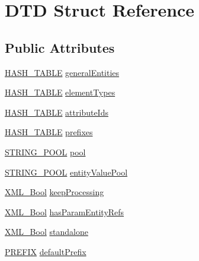 \hypertarget{struct_d_t_d}{}\section{D\+TD Struct Reference}
\label{struct_d_t_d}
\subsection*{Public Attributes}
\begin{DoxyCompactItemize}
\item 
\hyperlink{struct_h_a_s_h___t_a_b_l_e}{H\+A\+S\+H\+\_\+\+T\+A\+B\+LE} \hyperlink{struct_d_t_d_a761504bf30f388820739a5c376756076}{general\+Entities}
\item 
\hyperlink{struct_h_a_s_h___t_a_b_l_e}{H\+A\+S\+H\+\_\+\+T\+A\+B\+LE} \hyperlink{struct_d_t_d_a96a198838c9a76a867e54047562106ac}{element\+Types}
\item 
\hyperlink{struct_h_a_s_h___t_a_b_l_e}{H\+A\+S\+H\+\_\+\+T\+A\+B\+LE} \hyperlink{struct_d_t_d_a3bc0ac47b4a74de3721d991fc6209243}{attribute\+Ids}
\item 
\hyperlink{struct_h_a_s_h___t_a_b_l_e}{H\+A\+S\+H\+\_\+\+T\+A\+B\+LE} \hyperlink{struct_d_t_d_ad00dc50e4fb01b3013d902502f6932e3}{prefixes}
\item 
\hyperlink{struct_s_t_r_i_n_g___p_o_o_l}{S\+T\+R\+I\+N\+G\+\_\+\+P\+O\+OL} \hyperlink{struct_d_t_d_ab33febd17f0cfde7df39438cabdffa6e}{pool}
\item 
\hyperlink{struct_s_t_r_i_n_g___p_o_o_l}{S\+T\+R\+I\+N\+G\+\_\+\+P\+O\+OL} \hyperlink{struct_d_t_d_a80499c346a8c5f4ea1c9843002ad1705}{entity\+Value\+Pool}
\item 
\hyperlink{amiga_2include_2libraries_2expat_8h_a5fe41bca8b7a23b2405f1b967e70f33a}{X\+M\+L\+\_\+\+Bool} \hyperlink{struct_d_t_d_a5f05665b70425ea1608474df84d055e4}{keep\+Processing}
\item 
\hyperlink{amiga_2include_2libraries_2expat_8h_a5fe41bca8b7a23b2405f1b967e70f33a}{X\+M\+L\+\_\+\+Bool} \hyperlink{struct_d_t_d_a4e7d7f9bcee8ee1ac1ab4496f805c743}{has\+Param\+Entity\+Refs}
\item 
\hyperlink{amiga_2include_2libraries_2expat_8h_a5fe41bca8b7a23b2405f1b967e70f33a}{X\+M\+L\+\_\+\+Bool} \hyperlink{struct_d_t_d_abcf3c294cd95b1408fb0df186667bd56}{standalone}
\item 
\hyperlink{xmlparse_8c_aa3f98fd58683acd364daca2ddc737491}{P\+R\+E\+F\+IX} \hyperlink{struct_d_t_d_aece86e4f1ee1d3c70d11e009914c1ff9}{default\+Prefix}
\item 

\end{DoxyCompactItemize}
